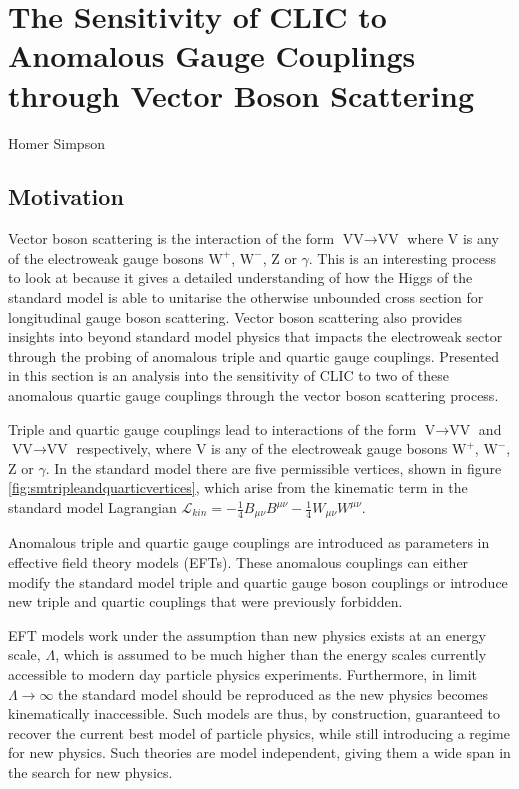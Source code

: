 \chapter{The Sensitivity of CLIC to Anomalous Gauge Couplings through Vector Boson Scattering}
\label{chap:PhysicsAnalysis}

%
{Homer Simpson}

\section{Motivation}
Vector boson scattering is the interaction of the form $\text{VV} \rightarrow \text{VV}$ where V is any of the electroweak gauge bosons $\text{W}^{+}$, $\text{W}^{-}$, Z or $\gamma$.  This is an interesting process to look at because it gives a detailed understanding of how the Higgs of the standard model is able to unitarise the otherwise unbounded cross section for longitudinal gauge boson scattering.  Vector boson scattering also provides insights into beyond standard model physics that impacts the electroweak sector through the probing of anomalous triple and quartic gauge couplings.  Presented in this section is an analysis into the sensitivity of CLIC to two of these anomalous quartic gauge couplings through the vector boson scattering process.

Triple and quartic gauge couplings lead to interactions of the form $\text{V} \rightarrow \text{VV}$ and $\text{VV} \rightarrow \text{VV}$ respectively, where V is any of the electroweak gauge bosons $\text{W}^{+}$, $\text{W}^{-}$, Z or $\gamma$.  In the standard model there are five permissible  vertices, shown in figure \ref{fig:smtripleandquarticvertices}, which arise from the kinematic term in the standard model Lagrangian $\mathcal{L}_{kin} = -\frac{1}{4}B_{\mu\nu}B^{\mu\nu} - \frac{1}{4}W_{\mu\nu}W^{\mu\nu}$.

Anomalous triple and quartic gauge couplings are introduced as parameters in effective field theory models (EFTs).  These anomalous couplings can either modify the standard model triple and quartic gauge boson couplings or introduce new triple and quartic couplings that were previously forbidden.  

EFT models work under the assumption than new physics exists at an energy scale, $\Lambda$, which is assumed to be much higher than the energy scales currently accessible to modern day particle physics experiments.  Furthermore, in limit $\Lambda \rightarrow \infty$ the standard model should be reproduced as the new physics becomes kinematically inaccessible.  Such models are thus, by construction, guaranteed to recover the current best model of particle physics, while still introducing a regime for new physics.  Such theories are model independent, giving them a wide span in the search for new physics.

